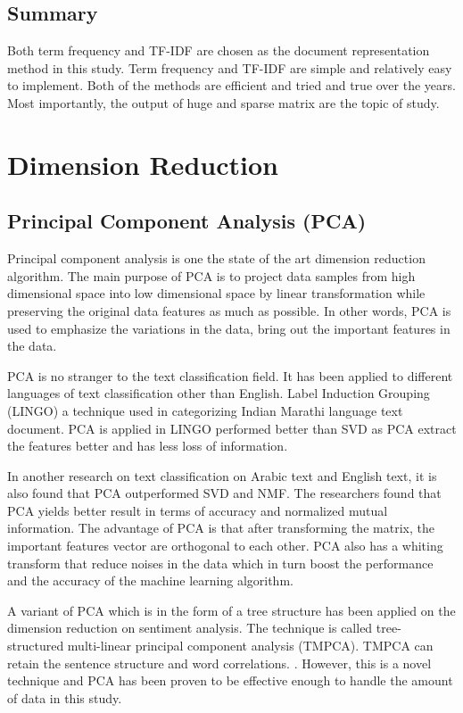 \subsection{Summary}
Both term frequency and TF-IDF are chosen as the document representation method in this study. Term frequency and TF-IDF are simple and relatively easy to implement. Both of the methods are efficient and tried and true over the years. Most importantly, the output of huge and sparse matrix are the topic of study.\\

\clearpage
\section{Dimension Reduction}
\subsection{Principal Component Analysis (PCA)}
Principal component analysis is one the state of the art dimension reduction algorithm. The main purpose of PCA is to project data samples from high dimensional space into low dimensional space by linear transformation while preserving the original data features as much as possible. \cite{pcaImage} In other words, PCA is used to emphasize the variations in the data, bring out the important features in the data.

PCA is no stranger to the text classification field. It has been applied to different languages of text classification other than English. Label Induction Grouping (LINGO) a technique used in categorizing Indian Marathi language text document. PCA is applied in LINGO performed better than SVD as PCA extract the features better and has less loss of information. \cite{lingo}

In another research on text classification on Arabic text and English text, it is also found that PCA outperformed SVD and NMF. The researchers found that PCA yields better result in terms of accuracy and normalized mutual information. The advantage of PCA is that after transforming the matrix, the important features vector are orthogonal to each other. PCA also has a whiting transform that reduce noises in the data which in turn boost the performance and the accuracy of the machine learning algorithm.\cite{dimReducArabic}

A variant of PCA which is in the form of a tree structure has been applied on the dimension reduction on sentiment analysis. The technique is called tree-structured multi-linear principal component analysis (TMPCA). TMPCA can retain the sentence structure and word correlations. \cite{treePca}. However, this is a novel technique and PCA has been proven to be effective enough to handle the amount of data in this study.\\

